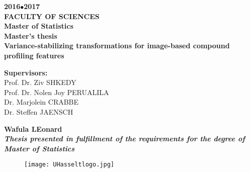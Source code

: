 \documentclass[11pt]{article}
\begin{document}


\clearpage\thispagestyle{empty}

\begin{flushleft}
	\textbf{\Large{
	2016$\bullet$2017 \\
	FACULTY OF SCIENCES \\
	Master of Statistics	
	}} \\ [2cm]
	\textbf{\huge{Master's thesis}} \\ 
	\textbf{{Variance-stabilizing transformations for image-based compound profiling features}} \\ [2cm]
\end{flushleft}

\vspace*{1cm}
\textbf{\large{Supervisors:}}\\
Prof. Dr. Ziv SHKEDY \\
Prof. Dr. Nolen Joy PERUALILA \\
Dr. Marjolein CRABBE \\
Dr. Steffen JAENSCH

\vspace*{2cm}
\textbf{\large{Wafula LEonard }}\\
\textit{\textbf{\large{Thesis presented in fulfillment of the requirements for the degree of Master of
Statistics}}} \\ [1cm]

\begin{figure}[!h]
\texttt{[image: UHasseltlogo.jpg]}
\end{figure}
\clearpage
\end{document}
